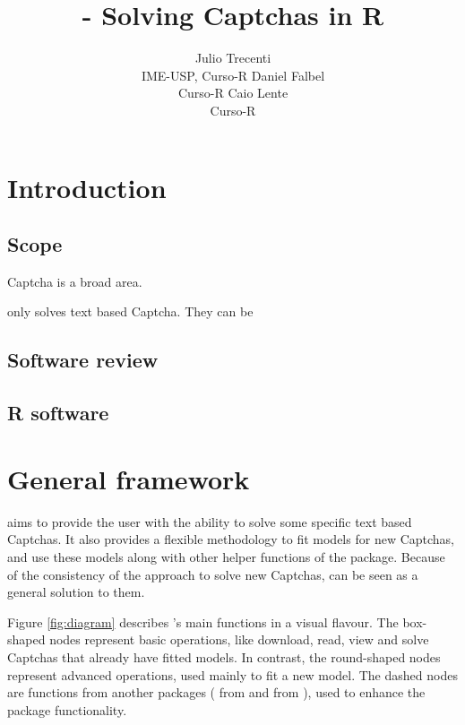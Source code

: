 \documentclass[article,nojss]{jss}
\author{
Julio Trecenti\\IME-USP, Curso-R \And Daniel Falbel\\Curso-R \And Caio Lente\\Curso-R
}
\title{\pkg{decryptr} - Solving Captchas in R}
\begin{document}
\hypertarget{introduction}{%
\section{Introduction}\label{introduction}}

\lipsum[2]

\hypertarget{scope}{%
\subsection{Scope}\label{scope}}

Captcha is a broad area.

 only solves text based Captcha. They can be

\hypertarget{software-review}{%
\subsection{Software review}\label{software-review}}

\lipsum[2]

\hypertarget{r-software}{%
\subsection{R software}\label{r-software}}

\lipsum[2]

\hypertarget{general-framework}{%
\section{General framework}\label{general-framework}}

 aims to provide the  user with the ability to
solve some specific text based Captchas. It also provides a flexible
methodology to fit models for new Captchas, and use these models along
with other helper functions of the package. Because of the consistency
of the approach to solve new Captchas,  can be seen as a
general solution to them.

Figure \ref{fig:diagram} describes 's main functions in a
visual flavour. The box-shaped nodes represent basic operations, like
download, read, view and solve Captchas that already have fitted models.
In contrast, the round-shaped nodes represent advanced operations, used
mainly to fit a new model. The dashed nodes are functions from another
packages ( from  and  from
), used to enhance the package functionality.
\end{document}
